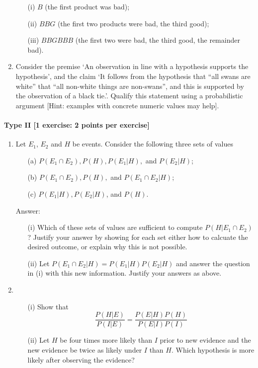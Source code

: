 \documentclass{article}
\begin{document}
\begin{enumerate}
		\begin{itemize}
			\item[(i)] $B$ (the first product was bad);
			\item[(ii)] $BBG$ (the first two products were bad, the third good);
			\item[(iii)] $BBGBBB$ (the first two were bad, the third good, the remainder bad).
		\end{itemize}
	\item Consider the premise `An observation in line with a hypothesis supports the hypothesis', and the claim `It follows from the hypothesis that ``all swans are white'' that ``all non-white things are non-swans'', and this is supported by the observation of a black tie.'. Qualify this statement using a probabilistic argument [Hint: examples with concrete numeric values may help].
      
\end{enumerate}		

\paragraph{Type II [1 exercise: 2 points per exercise]}
\begin{enumerate}
	\item Let $E_1$, $E_2$ and $H$ be events. Consider the following three sets of values
		    \begin{itemize}
			    \item[(a)] $P(E_1 \cap E_2), P(H), P(E_1 |H),$ and $P(E_2|H)$;
			    \item[(b)] $P(E_1 \cap E_2), P(H),$ and $P(E_1 \cap E_2|H)$;
			    \item[(c)] $P(E_1|H), P(E_2|H)$, and $P(H)$.
		    \end{itemize}

    Answer:
    \begin{itemize}
	    \item[(i)] Which of these sets of values are sufficient to compute $P(H|E_1 \cap E_2)$? 		    Justify your answer by showing for each set either how to calcuate the desired outcome, or explain why this is not possible.
	    \item[(ii)] Let $P(E_1 \cap E_2 |H) = P(E_1|H) P(E_2|H)$ and answer the question in (i) with this new information. Justify your answers as above.
    \end{itemize}
    \item \begin{itemize}
	  \item[(i)] Show that $$\frac{P(H|E)}{P(I|E)} = \frac{P(E|H)P(H)}{P(E|I)P(I)}$$
	  \item[(ii)] Let $H$ be four times more likely than $I$ prior to new evidence and the new evidence be twice as likely under $I$ than $H$. Which hypothesis is more likely after observing the evidence?
	  \end{itemize}
\end{enumerate}
\end{document}
